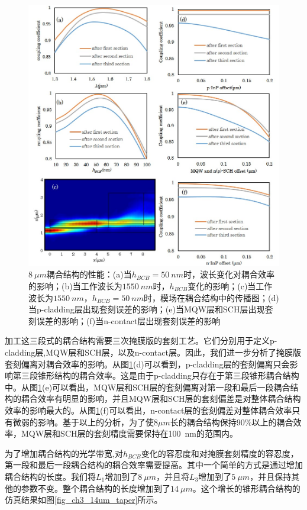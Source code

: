 \begin{figure}[htb]
	\centering
	\includegraphics[width=14cm]{./Pictures/fig_ch3_8um_taper.jpg}
	\caption{$8~\mu m$耦合结构的性能：(a)当$h_{BCB}=50~nm$时，波长变化对耦合效率的影响；(b)当工作波长为$1550~nm$时，$h_{BCB}$变化的影响；(c)当工作波长为$1550~nm$，$h_{BCB}=50~nm$时，模场在耦合结构中的传播图；(d)当p-cladding层出现套刻误差的影响；(e)当MQW层和SCH层出现套刻误差的影响；(f)当n-contact层出现套刻误差的影响}
	\label{fig_ch3_8um_taper}
\end{figure}

加工这三段式的耦合结构需要三次掩膜版的套刻工艺。它们分别用于定义p-cladding层,MQW层和SCH层，以及n-contact层。因此，我们进一步分析了掩膜版套刻偏离对耦合效率的影响。从图\ref{fig_ch3_8um_taper}(d)可以看到，p-cladding层的套刻偏离只会影响第三段锥形结构的耦合效率。这是由于p-cladding只存在于第三段锥形耦合结构中。从图\ref{fig_ch3_8um_taper}(e)可以看出，MQW层和SCH层的套刻偏离对第一段和最后一段耦合结构的耦合效率有明显的影响，并且MQW层和SCH层的套刻偏差是对整体耦合结构效率的影响最大的。从图\ref{fig_ch3_8um_taper}(f)可以看出，n-contact层的套刻偏差对整体耦合效率只有微弱的影响。基于以上的分析，为了使$8 \mu m$长的耦合结构保持90\%以上的耦合效率，MQW层和SCH层的套刻精度需要保持在100~nm的范围内。

为了增加耦合结构的光学带宽,对$h_{BCB}$变化的容忍度和对掩膜套刻精度的容忍度，第一段和最后一段耦合结构的耦合效率需要提高。其中一个简单的方式是通过增加耦合结构的长度。我们将$L_1$增加到了$8~\mu m$，并且将$L_3$增加到了$5~\mu m$，并且保持其他的参数不变。整个耦合结构的长度增加到了$14~\mu m$。这个增长的锥形耦合结构的仿真结果如图\ref{fig_ch3_14um_taper}所示。


